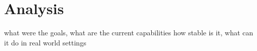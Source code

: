 \chapter{Analysis}


what were the goals, what are the current capabilities
\newline
how stable is it, what can it do in real world settings


